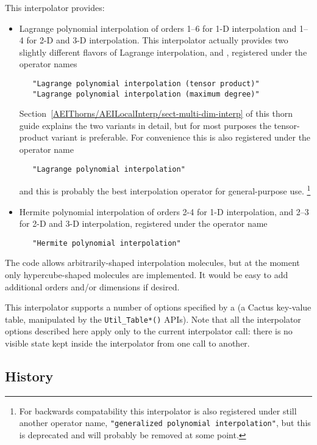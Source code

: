 This interpolator provides:
\begin{itemize}
\item	Lagrange polynomial interpolation of orders 1--6 for 1-D
	interpolation and 1--4 for 2-D and 3-D interpolation.
	This interpolator actually provides two slightly different
	flavors of Lagrange interpolation, 
	and , registered under the operator names
	\begin{verbatim}
   "Lagrange polynomial interpolation (tensor product)"
   "Lagrange polynomial interpolation (maximum degree)"
	\end{verbatim}
	Section~\ref{AEIThorns/AEILocalInterp/sect-multi-dim-interp}
	of this thorn guide explains the two variants in detail, but
	for most purposes the tensor-product variant is
	preferable.  For convenience this is also registered under
	the operator name
	\begin{verbatim}
   "Lagrange polynomial interpolation"
	\end{verbatim}
	and this is probably the best interpolation operator for
	general-purpose use.%
\footnote{%
	 For backwards compatability this interpolator
	 is also registered under still another operator name,
	 {\tt "generalized polynomial interpolation"}, but this
	 is deprecated and will probably be removed at some point.
	 }%
\item	Hermite polynomial interpolation of orders 2-4 for 1-D
	interpolation, and 2--3 for 2-D and 3-D interpolation,
	registered under the operator name
	\begin{verbatim}
   "Hermite polynomial interpolation"
	\end{verbatim}
\end{itemize}
The code allows arbitrarily-shaped interpolation molecules,
but at the moment only hypercube-shaped molecules are implemented.
It would be easy to add additional orders and/or dimensions if desired.

This interpolator supports a number of options specified by a
 (a Cactus key-value table, manipulated by the
\verb|Util_Table*()| APIs).  Note that all the interpolator options
described here apply only to the current interpolator call: there is
no visible state kept inside the interpolator from one call to another.


\subsection{History}


